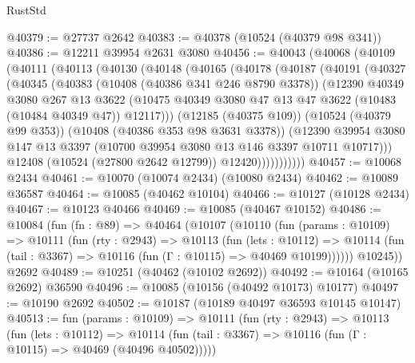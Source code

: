 \begin{lexlean}{RustStd}
\begin{coremodule}
@40379 := @27737 @2642
@40383 := @40378 (@10524 (@40379 @98 @341))
@40386 := @12211 @39954 @2631 @3080
@40456 := @40043
    (@40068
      (@40109
        (@40111
          (@40113
            (@40130
              (@40148
                (@40165
                  (@40178
                    (@40187
                      (@40191
                        (@40327
                          (@40345
                            (@40383
                              (@10408 (@40386 @341 @246 @8790 @3378))
                              (@12390
                                @40349
                                @3080
                                @267
                                @13
                                @3622
                                (@10475
                                  @40349
                                  @3080
                                  @47
                                  @13
                                  @47
                                  @3622
                                  (@10483 (@10484 @40349 @47))
                                  @12117)))
                            (@12185 (@40375 @109))
                            (@10524 (@40379 @99 @353))
                            (@10408 (@40386 @353 @98 @3631 @3378))
                            (@12390
                              @39954
                              @3080
                              @147
                              @13
                              @3397
                              (@10700 @39954 @3080 @13 @146 @3397 @10711 @10717)))
                          @12408
                          (@10524 (@27800 @2642 @12799))
                          @12420)))))))))))
@40457 := @10068 @2434
@40461 := @10070 (@10074 @2434) (@10080 @2434)
@40462 := @10089 @36587
@40464 := @10085 (@40462 @10104)
@40466 := @10127 (@10128 @2434)
@40467 := @10123 @40466
@40469 := @10085 (@40467 @10152)
@40486 := @10084
    (fun (fn : @89) =>
    @40464
      (@10107
        (@10110
          (fun (params : @10109) =>
          @10111
            (fun (rty : @2943) =>
            @10113
              (fun (lets : @10112) =>
              @10114 (fun (tail : @3367) => @10116 (fun (Γ : @10115) => @40469 @10199))))))
        @10245))
    @2692
@40489 := @10251 (@40462 (@10102 @2692))
@40492 := @10164 (@10165 @2692) @36590
@40496 := @10085 (@10156 (@40492 @10173) @10177)
@40497 := @10190 @2692
@40502 := @10187 (@10189 @40497 @36593 @10145 @10147)
@40513 := fun (params : @10109) =>
  @10111
    (fun (rty : @2943) =>
    @10113
      (fun (lets : @10112) =>
      @10114 (fun (tail : @3367) => @10116 (fun (Γ : @10115) => @40469 (@40496 @40502)))))

\end{coremodule}
\end{lexlean}

